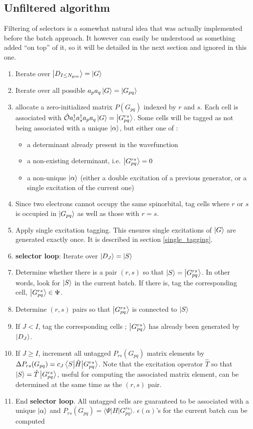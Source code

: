 \documentclass[./thesis.tex]{subfiles}
\begin{document}
\subsection{Unfiltered algorithm}

Filtering of selectors is a somewhat natural idea that was actually implemented before the batch approach. It however can easily be understood as something added ``on top'' of it, so it will be detailed in the next section and ignored in this one.



\begin{enumerate}
\item
Iterate over $\ket {D_{I \leq {N_\text{gen}}}} = \ket G$
\item
Iterate over all possible $a_p a_q \ket G = \ket {G_{pq}}$
\item
allocate a zero-initialized matrix $P(G_{pq})$ indexed by $r$ and $s$. Each cell is associated with ${\hat{\mathcal{O}}} a^\dagger_r a^\dagger_s a_p a_q  \ket G = \ket{G^{rs}_{pq}}$. Some cells will be tagged as not being associated with a unique $\ket \alpha$, but either one of :
\begin{itemize}
\item
a determinant already present in the wavefunction
\item
a non-existing determinant, i.e. $\ket{G^{rs}_{pq}} = 0$
\item
a non-unique $\ket \alpha$ (either a double excitation of a previous generator, or a single excitation of the current one)
\end{itemize}

\item
Since two electrons cannot occupy the same spinorbital, tag cells where $r$ or $s$ is occupied in $\ket {G_{pq}}$ as well as those with $r=s$.
\item
Apply single excitation tagging. This ensures single excitations of $\ket G$ are generated exactly once. It is described in section \ref{single_tagging}.
\item
\textbf{selector loop}: Iterate over $\ket {D_J} = \ket S$ 
\item
Determine whether there is a pair $(r,s)$ so that $\ket S = \ket {G_{pq}^{rs}}$. In other words, look for $\ket S$ in the current batch. If there is, tag the corresponding cell, $\ket{G^{rs}_{pq}} \in \Psi$.
\item
Determine $(r,s)$ pairs so that $\ket {G_{pq}^{rs}}$ is connected to $\ket S$
\item
If $J<I$, tag the corresponding cells ; $\ket{G^{rs}_{pq}}$ has already been generated by $\ket {D_J}$.
\item
If $J \geq I$, increment all untagged $P_{rs}(G_{pq})$ matrix elements by $\Delta P_{rs}(G_{pq}) = c_J \mel{S}{\hat{H}}{G^{rs}_{pq}}$. Note that the excitation operator $\hat{T}$ so that $\ket S=\hat{T} \ket{G^{rs}_{pq}}$, useful for computing the associated matrix element, can be determined at the same time as the $(r,s)$ pair.
\item
End \textbf{selector loop}. All untagged cells are guaranteed to be associated with a unique $\ket \alpha$ and $P_{rs}(G_{pq}) = \langle \Psi |H|G^{rs}_{pq} \rangle$. $\epsilon(\alpha)$'s for the current batch can be computed  \\


\end{enumerate}
\end{document}
